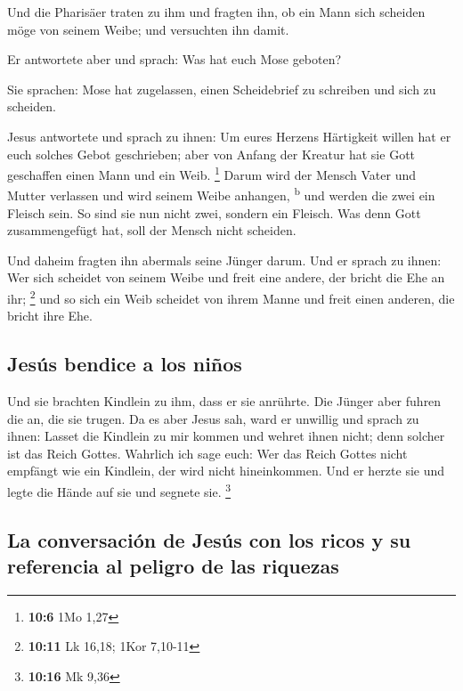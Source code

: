  Und die Pharisäer traten zu ihm und fragten ihn, ob ein
Mann sich scheiden möge von seinem Weibe; und versuchten ihn damit.

 Er antwortete aber und sprach: Was hat euch Mose geboten?

 Sie sprachen: Mose hat zugelassen, einen Scheidebrief zu
schreiben und sich zu scheiden.

 Jesus antwortete und sprach zu ihnen: Um eures Herzens
Härtigkeit willen hat er euch solches Gebot geschrieben; 
aber von Anfang der Kreatur hat sie Gott geschaffen einen Mann und ein
Weib. \footnote{\textbf{10:6} 1Mo 1,27}  Darum wird der
Mensch Vater und Mutter verlassen und wird seinem Weibe anhangen,
\textsuperscript{b}  und werden die zwei ein Fleisch sein.
So sind sie nun nicht zwei, sondern ein Fleisch.  Was denn
Gott zusammengefügt hat, soll der Mensch nicht scheiden.

 Und daheim fragten ihn abermals seine Jünger darum.
 Und er sprach zu ihnen: Wer sich scheidet von seinem
Weibe und freit eine andere, der bricht die Ehe an ihr; \footnote{\textbf{10:11}
  Lk 16,18; 1Kor 7,10-11}  und so sich ein Weib scheidet
von ihrem Manne und freit einen anderen, die bricht ihre Ehe.

\hypertarget{jesuxfas-bendice-a-los-niuxf1os}{%
\subsection{Jesús bendice a los
niños}\label{jesuxfas-bendice-a-los-niuxf1os}}

 Und sie brachten Kindlein zu ihm, dass er sie anrührte.
Die Jünger aber fuhren die an, die sie trugen.  Da es
aber Jesus sah, ward er unwillig und sprach zu ihnen: Lasset die
Kindlein zu mir kommen und wehret ihnen nicht; denn solcher ist das
Reich Gottes.  Wahrlich ich sage euch: Wer das Reich
Gottes nicht empfängt wie ein Kindlein, der wird nicht hineinkommen.
 Und er herzte sie und legte die Hände auf sie und
segnete sie. \footnote{\textbf{10:16} Mk 9,36}

\hypertarget{la-conversaciuxf3n-de-jesuxfas-con-los-ricos-y-su-referencia-al-peligro-de-las-riquezas}{%
\subsection{La conversación de Jesús con los ricos y su referencia al
peligro de las
riquezas}\label{la-conversaciuxf3n-de-jesuxfas-con-los-ricos-y-su-referencia-al-peligro-de-las-riquezas}}

